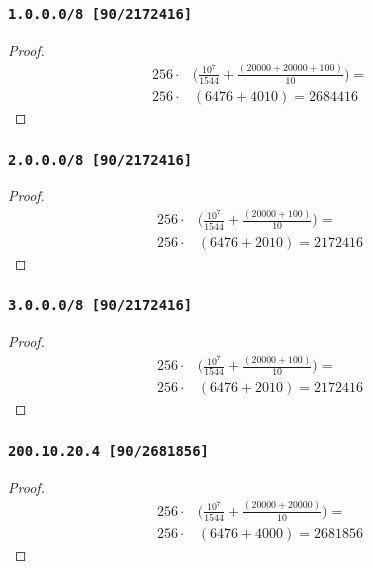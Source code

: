 \documentclass[12pt, times]{simauth}
\begin{document}
\begin{minipage}[t]{0.45\linewidth}
\subsubsection{\texttt{1.0.0.0/8 [90/2172416]}}
\begin{proof}
    \begin{align*}
        256 \cdot & \bigg(\frac{10^7}{1544} + \frac{(20000 + 20000 + 100)}{10}\bigg) = \\
        256 \cdot & (6476 + 4010) = 2684416
    \end{align*}
\end{proof}
\subsubsection{\texttt{2.0.0.0/8 [90/2172416]}}
\begin{proof}
    \begin{align*}
        256 \cdot & \bigg(\frac{10^7}{1544} + \frac{(20000 + 100)}{10}\bigg) = \\
        256 \cdot & (6476 + 2010) = 2172416
    \end{align*}
\end{proof}
\end{minipage} \hfill
\begin{minipage}[t]{0.45\linewidth}  
\subsubsection{\texttt{3.0.0.0/8 [90/2172416]}}
\begin{proof}
    \begin{align*}
        256 \cdot & \bigg(\frac{10^7}{1544} + \frac{(20000 + 100)}{10}\bigg) = \\
        256 \cdot & (6476 + 2010) = 2172416
    \end{align*}
\end{proof}
\subsubsection{\texttt{200.10.20.4 [90/2681856]}}
\begin{proof}
    \begin{align*}
        256 \cdot & \bigg(\frac{10^7}{1544} + \frac{(20000 + 20000)}{10}\bigg) = \\
        256 \cdot & (6476 + 4000) = 2681856
    \end{align*}
\end{proof}

\end{minipage}
\end{document}
